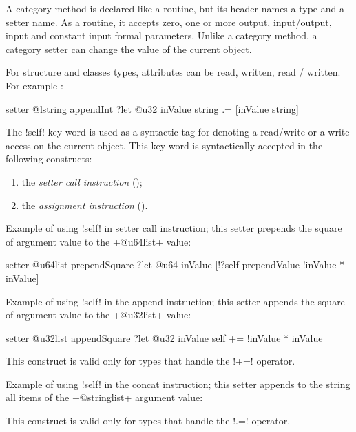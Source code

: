 
A category method is declared like a routine, but its header names a type and a setter name. As a routine, it accepts zero, one or more output, input/output, input and constant input formal parameters. Unlike a category method, a category setter can change the value of the current object.

For structure and classes types, attributes can be read, written, read / written. For example :
\begin{galgas4}
setter @lstring appendInt ?let @u32 inValue {
  string .= [inValue string]
}
\end{galgas4}


The  \ggsq!self! key word is used as a syntactic tag for denoting a read/write or a write access on the current object. This key word is syntactically accepted in the following constructs:
\begin{enumerate}
\item the \emph{setter call instruction} ();
\item the \emph{assignment instruction} ().
\end{enumerate}

Example of using  \ggsq!self! in setter call instruction; this setter prepends the square of argument value to the \ggsq+@u64list+ value:
\begin{galgas4}
setter @u64list prependSquare ?let @u64 inValue {
  [!?self prependValue !inValue * inValue]
}
\end{galgas4}


Example of using  \ggsq!self! in the append instruction; this setter appends the square of argument value to the \ggsq+@u32list+ value:
\begin{galgas4}
setter @u32list appendSquare ?let @u32 inValue {
  self += !inValue * inValue
}
\end{galgas4}
This construct is valid only for types that handle the  \ggsq!+=! operator.


Example of using  \ggsq!self! in the concat instruction; this setter appends to the string all items of the \ggsq+@stringlist+ argument value:
\begin{galgas4}
setter @string concatList ?let @stringlist inList {
  for inList do
    self .= mValue
  }
}
\end{galgas4}
This construct is valid only for types that handle the  \ggsq!.=! operator.




